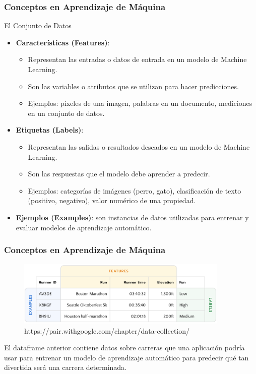 \documentclass{beamer}
\begin{document}
	

\begin{frame}
	\frametitle{Conceptos en Aprendizaje de Máquina}
			\begin{block}{El Conjunto de Datos}
	\begin{itemize}
		\item \textbf{Características (Features)}:
		\begin{itemize}
			\item Representan las entradas o datos de entrada en un modelo de Machine Learning.
			\item Son las variables o atributos que se utilizan para hacer predicciones.
			\item Ejemplos: píxeles de una imagen, palabras en un documento, mediciones en un conjunto de datos.
		\end{itemize}			
		\item \textbf{Etiquetas (Labels)}:
		\begin{itemize}
			\item Representan las salidas o resultados deseados en un modelo de Machine Learning.
			\item Son las respuestas que el modelo debe aprender a predecir.
			\item Ejemplos: categorías de imágenes (perro, gato), clasificación de texto (positivo, negativo), valor numérico de una propiedad.
		\end{itemize}
		\item \textbf{Ejemplos (Examples)}: son instancias de datos utilizadas para entrenar y evaluar modelos de aprendizaje automático.
	\end{itemize}
		\end{block}
\end{frame}


\begin{frame}
\frametitle{Conceptos en Aprendizaje de Máquina}
\begin{figure}
	\includegraphics[width=0.9\textwidth]{labels_features}
	\caption{https://pair.withgoogle.com/chapter/data-collection/}
	\centering
\end{figure}
\begin{block}{}
El dataframe anterior contiene datos sobre carreras que una aplicación podría usar para entrenar un modelo de aprendizaje automático para predecir qué tan divertida será una carrera determinada.
\end{block}
\end{frame}
\end{document}
